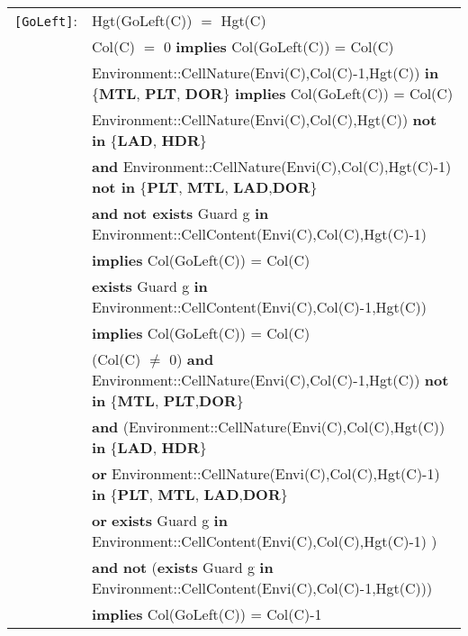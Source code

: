 \documentclass[7pt]{article}
\begin{document}
\begin{tabular}{rl}
\texttt{[GoLeft]}: & \textrm{Hgt(GoLeft(C))} $=$ \textrm{Hgt(C)} \\
& \textrm{Col(C)} $=$ 0 \textbf{implies} \textrm{Col(GoLeft(C))} = \textrm{Col(C)} \\
& \textrm{Environment::CellNature(Envi(C),Col(C)-1,Hgt(C))} \textbf{in} \{\textbf{MTL}, \textbf{PLT}, \textbf{DOR}\} \textbf{implies} \textrm{Col(GoLeft(C))} = \textrm{Col(C)} \\
& \textrm{Environment::CellNature(Envi(C),Col(C),Hgt(C))} \textbf{not in} \{\textbf{LAD}, \textbf{HDR}\}
\\ & \quad\quad \textbf{and} \textrm{Environment::CellNature(Envi(C),Col(C),Hgt(C)-1)} \textbf{not in} \{\textbf{PLT}, \textbf{MTL}, \textbf{LAD},\textbf{DOR}\} \\
& \quad\quad \textbf{and} \textbf{not exists} \textrm{Guard} g \textbf{in} \textrm{Environment::CellContent(Envi(C),Col(C),Hgt(C)-1)} \\
& \quad\quad \textbf{implies} \textrm{Col(GoLeft(C))} = \textrm{Col(C)} \\
& \textbf{exists} \textrm{Guard} g \textbf{in} \textrm{Environment::CellContent(Envi(C),Col(C)-1,Hgt(C))} \\ & \quad\quad \textbf{implies} \textrm{Col(GoLeft(C))} = \textrm{Col(C)} \\
& (\textrm{Col(C)} $\neq$ 0) \textbf{and} \textrm{Environment::CellNature(Envi(C),Col(C)-1,Hgt(C))} \textbf{not in} \{\textbf{MTL}, \textbf{PLT},\textbf{DOR}\} \\
& \quad\quad \textbf{and} (\textrm{Environment::CellNature(Envi(C),Col(C),Hgt(C))} \textbf{in} \{\textbf{LAD}, \textbf{HDR}\} \\
& \quad\quad\quad\quad \textbf{or} \textrm{Environment::CellNature(Envi(C),Col(C),Hgt(C)-1)} \textbf{in} \{\textbf{PLT}, \textbf{MTL}, \textbf{LAD},\textbf{DOR}\} \\
& \quad\quad\quad\quad \textbf{or} \textbf{exists} \textrm{Guard} g \textbf{in} \textrm{Environment::CellContent(Envi(C),Col(C),Hgt(C)-1)} ) \\
& \quad\quad \textbf{and} \textbf{not} (\textbf{exists} \textrm{Guard} g \textbf{in} \textrm{Environment::CellContent(Envi(C),Col(C)-1,Hgt(C))}) \\
& \quad\quad \textbf{implies} \textrm{Col(GoLeft(C))} = \textrm{Col(C)}-1 \\


\end{tabular}
\end{document}
